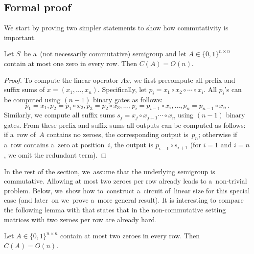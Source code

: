 \documentclass{toc}
\begin{document}
\subsection{Formal proof}
We start by proving two simpler statements to show how commutativity is
important.

\begin{lemma}\label{lemma:easy}
Let $S$~be a~(not necessarily commutative) semigroup and let
$A \in \{0,1\}^{n \times n}$ contain at most
one zero in every row. Then
$C(A) = O(n)$.
\end{lemma}

\begin{proof}
To compute the linear operator $Ax$, we first
precompute all prefix and suffix sums of $x=(x_1, \dotsc, x_n)$.
Specifically, let $p_i=x_1 \circ x_2 \circ \dotsb \circ x_i$. All $p_i$'s can be
computed using $(n-1)$ binary gates as follows:
\[
p_1=x_1, p_2=p_1 \circ x_2, p_3=p_2 \circ x_3, \dotsc, p_i=p_{i-1} \circ x_i, \dotsc, p_n=p_{n-1}\circ x_n\,.
\]
Similarly, we compute all suffix sums
$s_j=x_j \circ x_{j+1} \dotsb \circ x_n$ using
$(n-1)$ binary gates. From these prefix and suffix sums
all outputs can be
computed as follows: if a~row of~$A$ contains no zeroes,
the corresponding
output is~$p_n$; otherwise if a~row contains a~zero at position~$i$, the
output is $p_{i-1} \circ s_{i+1}$ (for $i=1$ and $i=n$, we omit the redundant
term).
\end{proof}

In the rest of the section, we~assume that the
underlying semigroup is
commutative. Allowing at most two zeroes per row already leads to a~non-trivial
problem.
Below, we~show how to~construct a~circuit of~linear size for
this special case (and later~on we~prove a~more general result).
It is interesting to compare the following lemma
with  that states that in the
non-commutative setting matrices with two zeroes per row are already hard.

\begin{lemma} \label{lem:at_most_2}
Let $A \in \{0,1\}^{n \times n}$ contain at most two zeroes in every row. Then
$C(A) = O(n)$.
\end{lemma}
\end{document}

